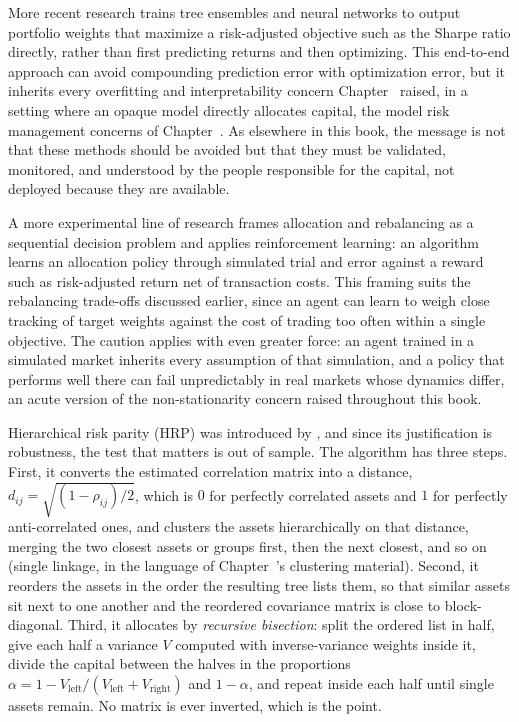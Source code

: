 \documentclass[../ai_in_finance]{subfiles}
\begin{document}
More recent research trains tree ensembles and neural networks to output portfolio weights that maximize a risk-adjusted objective such as the Sharpe ratio directly, rather than first predicting returns and then optimizing.
This end-to-end approach can avoid compounding prediction error with optimization error, but it inherits every overfitting and interpretability concern Chapter~ raised, in a setting where an opaque model directly allocates capital, the model risk management concerns of Chapter~. As elsewhere in this book, the message is not that these methods should be avoided but that they must be validated, monitored, and understood by the people responsible for the capital, not deployed because they are available.

A more experimental line of research frames allocation and rebalancing as a sequential decision problem and applies reinforcement learning: an algorithm learns an allocation policy through simulated trial and error against a reward such as risk-adjusted return net of transaction costs.
This framing suits the rebalancing trade-offs discussed earlier, since an agent can learn to weigh close tracking of target weights against the cost of trading too often within a single objective.
The caution applies with even greater force: an agent trained in a simulated market inherits every assumption of that simulation, and a policy that performs well there can fail unpredictably in real markets whose dynamics differ, an acute version of the non-stationarity concern raised throughout this book.

\label{sec:hrp-example}

Hierarchical risk parity (HRP) was introduced by \textcite{lopezdeprado2016building}, and since its justification is robustness, the test that matters is out of sample. The algorithm has three steps. First, it converts the estimated correlation matrix into a distance, $d_{ij}=\sqrt{(1-\rho_{ij})/2}$, which is $0$ for perfectly correlated assets and $1$ for perfectly anti-correlated ones, and clusters the assets hierarchically on that distance, merging the two closest assets or groups first, then the next closest, and so on (single linkage, in the language of Chapter~'s clustering material). Second, it reorders the assets in the order the resulting tree lists them, so that similar assets sit next to one another and the reordered covariance matrix is close to block-diagonal. Third, it allocates by \emph{recursive bisection}: split the ordered list in half, give each half a variance $V$ computed with inverse-variance weights inside it, divide the capital between the halves in the proportions $\alpha = 1 - V_{\text{left}}/(V_{\text{left}}+V_{\text{right}})$ and $1-\alpha$, and repeat inside each half until single assets remain. No matrix is ever inverted, which is the point.
\end{document}
